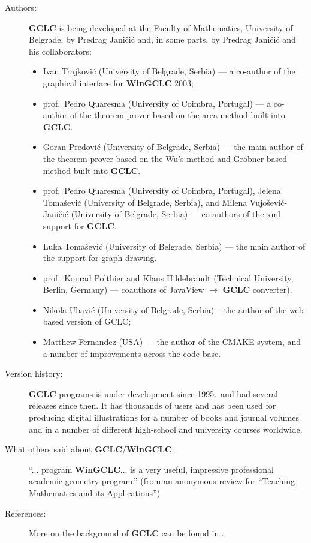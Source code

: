 \documentclass[a4paper]{book}
\newcommand{\gclc}{{\bfseries GCLC}\xspace}
\newcommand{\wingclc}{{\bfseries WinGCLC}\xspace}
\begin{document}
\begin{description}
\item[Authors:]
\gclc is being developed at the Faculty of Mathematics,
University of Belgrade, by Predrag Janičić and, in some
parts, by Predrag Janičić and his collaborators:
\begin{itemize}
\item Ivan Trajković (University of Belgrade, Serbia)
--- a co-author of the graphical interface for \wingclc 2003;
\item prof.~Pedro Quaresma (University of Coimbra, Portugal) ---
a co-author of the theorem prover based on the area method built into \gclc.

\item Goran Predović (University of Belgrade, Serbia) --- the main
author of the theorem prover based on the Wu's method and Gr\"obner 
based method built into \gclc.

\item prof.~Pedro Quaresma (University of Coimbra, Portugal),
Jelena Tomašević (University of Belgrade, Serbia), and
Milena Vujošević-Janičić (University of Belgrade, Serbia)
--- co-authors of the {\sc xml} support for \gclc.

\item Luka Tomašević (University of Belgrade, Serbia) --- the
main author of the support for graph drawing.

\item prof.~Konrad Polthier and Klaus Hildebrandt (Technical University,
Berlin, Germany) --- coauthors of JavaView $\rightarrow$ \gclc converter).

\item Nikola Ubavić (University of Belgrade, Serbia) --
the author of the web-based version of GCLC;

\item Matthew Fernandez (USA) --- the author of the CMAKE system,
and a number of improvements across the code base.
\end{itemize}

\item[Version history:]
\gclc programs is under development since 1995.~and had several releases 
since then. It has thousands of users and has been used for producing 
digital illustrations for a number of books and journal volumes and in 
a number of different high-school and university courses worldwide.

\item[What others said about \gclc/\wingclc:]
``... program \wingclc ... is a very useful, impressive professional
academic geometry program.'' (from an anonymous review for ``Teaching
Mathematics and its Applications'')

\item[References:]
More on the background of \gclc can be found in
\cite{gclc,wingclc, constructions-teamat,gclc-mkm,gclc-ijcar,gclc-jar}.
\end{description}
\end{document}
